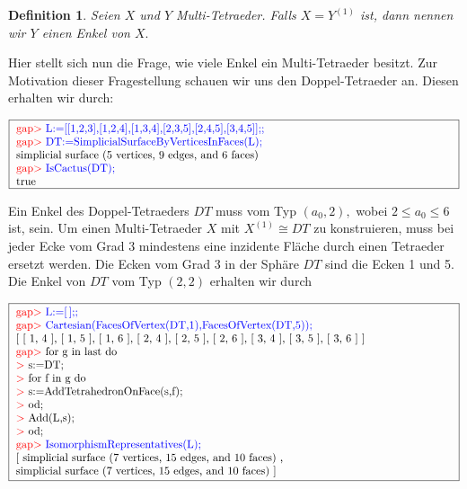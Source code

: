 \documentclass[12pt,titlepage,twoside,cleardoublepage]{article}
\theoremstyle{nummermitklammern}
\newtheorem{definition}[temp]{Definition}
\newtheorem{definition}[zahl]{Definition}
\numberwithin{equation}{section}
\begin{document}
\begin{definition}
Seien $X$ und $Y$ Multi-Tetraeder. Falls $X=Y^{(1)}$ ist, dann nennen wir $Y$ einen \emph{Enkel} von $X.$ 
\end{definition}

Hier stellt sich nun die Frage, wie viele Enkel ein Multi-Tetraeder besitzt. 
Zur Motivation dieser Fragestellung schauen wir uns den Doppel-Tetraeder an.
Diesen erhalten wir durch:
\begin{center}
 $\fbox{
\parbox{14cm}{
\textcolor{red}{gap$>$} \textcolor{blue}{L:=[[1,2,3],[1,2,4],[1,3,4],[2,3,5],[2,4,5],[3,4,5]];;}\newline
\textcolor{red}{gap$>$} \textcolor{blue}{DT:=SimplicialSurfaceByVerticesInFaces(L);}\newline
simplicial surface (5 vertices, 9 edges, and 6 faces)\newline
\textcolor{red}{gap$>$} \textcolor{blue}{IsCactus(DT);}\newline
true
}}$
\end{center}
Ein Enkel des Doppel-Tetraeders $DT$ muss vom Typ $(a_0,2),$ wobei $2\leq a_0 \leq 6$ ist, sein.
Um einen Multi-Tetraeder $X$ mit $X^{(1)}\cong DT$ zu konstruieren, muss bei jeder Ecke vom Grad 3 mindestens eine inzidente Fläche durch einen Tetraeder ersetzt werden. Die Ecken vom Grad 3 in der Sphäre $DT$ sind die Ecken 1 und 5. 
Die Enkel von $DT$ vom Typ $(2,2)$ erhalten wir durch
\begin{center}
 $\fbox{
\parbox{14cm}{
\textcolor{red}{gap$>$} \textcolor{blue}{L:=[\,];;}\newline
\textcolor{red}{gap$>$} \textcolor{blue}{Cartesian(FacesOfVertex(DT,1),FacesOfVertex(DT,5));}\newline
[ [ 1, 4 ], [ 1, 5 ], [ 1, 6 ], [ 2, 4 ], [ 2, 5 ], [ 2, 6 ], [ 3, 4 ],
  [ 3, 5 ], [ 3, 6 ] ]\newline
\textcolor{red}{gap$>$} for g in last do\newline
\textcolor{red}{$>$} s:=DT;\newline
\textcolor{red}{$>$} for f in g do\newline
\textcolor{red}{$>$} s:=AddTetrahedronOnFace(s,f);\newline
\textcolor{red}{$>$} od;\newline
\textcolor{red}{$>$} Add(L,s);\newline
\textcolor{red}{$>$} od;\newline
\textcolor{red}{gap$>$} \textcolor{blue}{IsomorphismRepresentatives(L);}\newline
[ simplicial surface (7 vertices, 15 edges, and 10 faces)
    ,\newline
  simplicial surface (7 vertices, 15 edges, and 10 faces)
 ]
 }}$
 \end{center}
\end{document}
